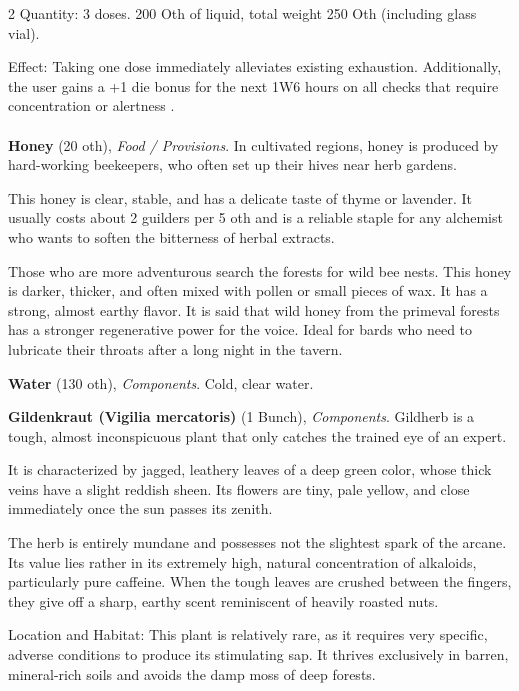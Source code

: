 \begin{multicols}{2}
Quantity:
3 doses. 200 Oth of liquid, total weight 250 Oth (including glass vial).

Effect:
Taking one dose immediately alleviates existing exhaustion. Additionally, the user gains a +1 die bonus for the next 1W6 hours on all checks that require concentration or alertness
.

    \paragraph{}
    \begin{denseitemize}
        \item \textbf{Honey} (20 oth), \textit{Food / Provisions}.
        In cultivated regions, honey is produced by hard-working beekeepers, who often set up their hives near herb gardens.

This honey is clear, stable, and has a delicate taste of thyme or lavender. It usually costs about 2 guilders per 5 oth and is a reliable staple for any alchemist who wants to soften the bitterness of herbal extracts.

Those who are more adventurous search the forests for wild bee nests. This honey is darker, thicker, and often mixed with pollen or small pieces of wax. It has a strong, almost earthy flavor. It is said that wild honey from the primeval forests has a stronger regenerative power for the voice. Ideal for bards who need to lubricate their throats after a long night in the tavern.
        \item \textbf{Water} (130 oth), \textit{Components}.
        Cold, clear water.
        \item \textbf{Gildenkraut (Vigilia mercatoris)} (1 Bunch), \textit{Components}.
        Gildherb is a tough, almost inconspicuous plant that only catches the trained eye of an expert.

It is characterized by jagged, leathery leaves of a deep green color, whose thick veins have a slight reddish sheen. Its flowers are tiny, pale yellow, and close immediately once the sun passes its zenith.

The herb is entirely mundane and possesses not the slightest spark of the arcane. Its value lies rather in its extremely high, natural concentration of alkaloids, particularly pure caffeine. When the tough leaves are crushed between the fingers, they give off a sharp, earthy scent reminiscent of heavily roasted nuts.

Location and Habitat:
This plant is relatively rare, as it requires very specific, adverse conditions to produce its stimulating sap. It thrives exclusively in barren, mineral-rich soils and avoids the damp moss of deep forests.


\end{denseitemize}
\end{multicols}
